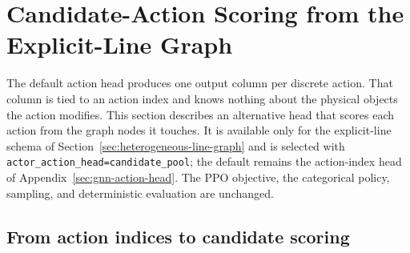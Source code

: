 \section{Candidate-Action Scoring from the Explicit-Line Graph}
\label{sec:candidate-action-scoring}

The default action head produces one output column per discrete action. That
column is tied to an action index and knows nothing about the physical objects
the action modifies. This section describes an alternative head that scores each
action from the graph nodes it touches. It is available only for the
explicit-line schema of Section~\ref{sec:heterogeneous-line-graph} and is
selected with \texttt{actor\_action\_head=candidate\_pool}; the default remains
the action-index head of Appendix~\ref{sec:gnn-action-head}. The PPO objective,
the categorical policy, sampling, and deterministic evaluation are unchanged.

\subsection{From action indices to candidate scoring}
\label{subsec:candidate-motivation}

